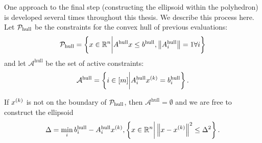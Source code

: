 One approach to the final step (constructing the ellipsoid within the polyhedron) is developed several times throughout this thesis.
We describe this process here.
Let $\mathcal P_{\textrm{hull}}$ be the constraints for the convex hull of previous evaluations:
\begin{align*}
\mathcal P_{\textrm{hull}} = \left\{x \in \mathbb R^n \bigg | A^{\textrm{hull}} x \le b^{\textrm{hull}}, \left\|A_i^{\textrm{hull}}\right\| = 1 \forall i \right\}
\end{align*}
and let $\mathcal A^{\textrm{hull}}$ be the set of active constraints:
\begin{align*}
\mathcal A^{\textrm{hull}} = \left\{i \in [m] \bigg | A_i^{\textrm{hull}} x^{(k)} = b_i^{\textrm{hull}} \right\}.
\end{align*}

If $x^{(k)}$ is not on the boundary of $\mathcal P_{\textrm{hull}}$, then $\mathcal A^{\textrm{hull}} = \emptyset$ and we are free to construct the ellipsoid
\begin{align*}
\Delta = \min_{i} b_i^{\textrm{hull}} - A_i^{\textrm{hull}} x^{(k)},
\left\{x \in \mathbb R^n \bigg | \left\|x - x^{(k)}\right\|^2 \le \Delta^2\right\}.
\end{align*}
% 

